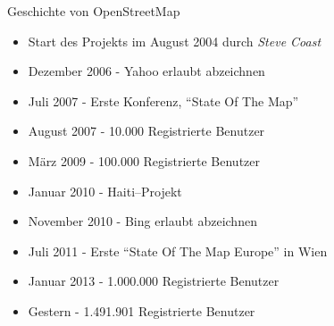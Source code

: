 \documentclass{beamer}
\begin{document}
  
{

\begin{frame}{Geschichte von OpenStreetMap}
  \vspace{0.6cm}
\begin{itemize}
  \item Start des Projekts im August 2004 durch \emph{Steve Coast}
  \item Dezember 2006 - Yahoo erlaubt abzeichnen
  \item Juli 2007 - Erste Konferenz, "`State Of The Map"'
  \item August 2007 - 10.000 Registrierte Benutzer
  \item März 2009 - 100.000 Registrierte Benutzer
  \item Januar 2010 - Haiti--Projekt
  \item November 2010 - Bing erlaubt abzeichnen
  \item Juli 2011 - Erste "`State Of The Map Europe"' in Wien
  \item Januar 2013 - 1.000.000 Registrierte Benutzer
  \item Gestern - 1.491.901 Registrierte Benutzer
\end{itemize}

\end{frame}
}
\end{document}
